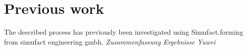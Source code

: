 \section{Previous work}

The described process has previously been investigated using Simufact.forming from simufact engineering gmbh. \textit{Zusammenfassung Ergebnisse Yuwei}
